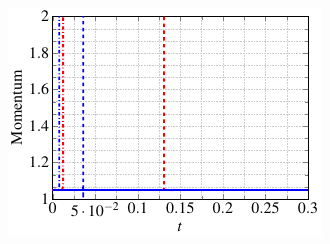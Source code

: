 \begin{figure}
\begin{subfigure}[]{0.48\linewidth}
          \includegraphics[scale=1]{Figures/paper-figure10.pdf}

\end{subfigure}
\end{figure}
